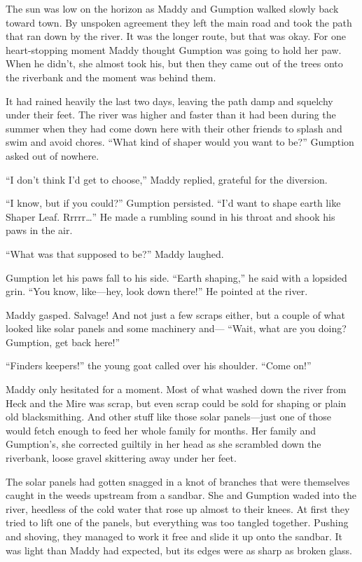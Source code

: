 \documentclass[10pt]{article}
\begin{document}
The sun was low on the horizon as Maddy and Gumption walked slowly back
toward town. By unspoken agreement they left the main road and took the
path that ran down by the river. It was the longer route, but that was
okay. For one heart-stopping moment Maddy thought Gumption was going to
hold her paw. When he didn't, she almost took his, but then they came
out of the trees onto the riverbank and the moment was behind them.

It had rained heavily the last two days, leaving the path damp and
squelchy under their feet. The river was higher and faster than it had
been during the summer when they had come down here with their other
friends to splash and swim and avoid chores. ``What kind of shaper would
you want to be?'' Gumption asked out of nowhere.

``I don't think I'd get to choose,'' Maddy replied, grateful for the
diversion.

``I know, but if you could?'' Gumption persisted. ``I'd want to shape
earth like Shaper Leaf. Rrrrr\ldots{}'' He made a rumbling sound in his
throat and shook his paws in the air.

``What was that supposed to be?'' Maddy laughed.

Gumption let his paws fall to his side. ``Earth shaping,'' he said with
a lopsided grin. ``You know, like---hey, look down there!'' He pointed
at the river.

Maddy gasped. Salvage! And not just a few scraps either, but a couple of
what looked like solar panels and some machinery and--- ``Wait, what are
you doing? Gumption, get back here!''

``Finders keepers!'' the young goat called over his shoulder. ``Come
on!''

Maddy only hesitated for a moment. Most of what washed down the river
from Heck and the Mire was scrap, but even scrap could be sold for
shaping or plain old blacksmithing. And other stuff like those solar
panels---just one of those would fetch enough to feed her whole family
for months. Her family and Gumption's, she corrected guiltily in her
head as she scrambled down the riverbank, loose gravel skittering away
under her feet.

The solar panels had gotten snagged in a knot of branches that were
themselves caught in the weeds upstream from a sandbar. She and Gumption
waded into the river, heedless of the cold water that rose up almost to
their knees. At first they tried to lift one of the panels, but
everything was too tangled together. Pushing and shoving, they managed
to work it free and slide it up onto the sandbar. It was light than
Maddy had expected, but its edges were as sharp as broken glass.
\end{document}
